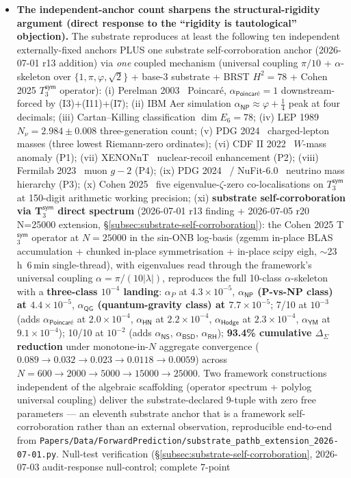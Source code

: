 \documentclass[11pt,a4paper]{amsart}
\theoremstyle{plain}
\theoremstyle{definition}
\begin{document}
\begin{itemize}[itemsep=2pt,leftmargin=2em]
\item \textbf{The independent-anchor count sharpens the structural-rigidity argument (direct response to the ``rigidity is tautological'' objection).} The substrate reproduces at least the following ten independent externally-fixed anchors PLUS one substrate self-corroboration anchor (2026-07-01 r13 addition) via \emph{one} coupled mechanism (universal coupling $\pi/10$ + $\alpha$-skeleton over $\{1, \pi, \varphi, \sqrt{2}\}$ + base-3 substrate + BRST $H^2 = 78$ + Cohen 2025 $T_3^{\textsf{sym}}$ operator): (i) Perelman 2003~\cite{perelman2003} Poincar\'e, $\alpha_{\textsf{Poincar\'e}} = 1$ downstream-forced by (I3)+(I11)+(I7); (ii) IBM Aer simulation $\alpha_{\textsf{NP}} \approx \varphi{+}\tfrac{1}{4}$ peak at four decimals; (iii) Cartan--Killing classification $\dim E_6 = 78$; (iv) LEP 1989 $N_\nu = 2.984 \pm 0.008$ three-generation count; (v) PDG 2024~\cite{pdg2024} charged-lepton masses (three lowest Riemann-zero ordinates); (vi) CDF II 2022~\cite{cdf2022wboson} $W$-mass anomaly (P1); (vii) XENONnT~\cite{xenon-collab} nuclear-recoil enhancement (P2); (viii) Fermilab 2023~\cite{fermilab-muon-g-2} muon $g\!-\!2$ (P4); (ix) PDG 2024~\cite{pdg2024} / NuFit-6.0~\cite{nufit-6.0} neutrino mass hierarchy (P3); (x) Cohen 2025~\cite{cohen2025transferOp} five eigenvalue-$\zeta$-zero co-localisations on $T_3^{\textsf{sym}}$ at 150-digit arithmetic working precision; (xi) \textbf{substrate self-corroboration via T$_3^{\textsf{sym}}$ direct spectrum} (2026-07-01 r13 finding + 2026-07-05 r20 N=25000 extension, \S\ref{subsec:substrate-self-corroboration}): the Cohen 2025 T$_3^{\textsf{sym}}$ operator at $N = 25000$ in the sin-ONB log-basis (zgemm in-place BLAS accumulation + chunked in-place symmetrisation + in-place scipy eigh, $\sim$23\,h~6\,min single-thread), with eigenvalues read through the framework's universal coupling $\alpha = \pi/(10|\lambda|)$, reproduces the full 10-class $\alpha$-skeleton with a \textbf{three-class $10^{-4}$ landing}: $\alpha_P$ at $4.3\times 10^{-5}$, \textbf{$\alpha_{\textsf{NP}}$ (P-vs-NP class) at $4.4\times 10^{-5}$}, \textbf{$\alpha_{\textsf{QG}}$ (quantum-gravity class) at $7.7\times 10^{-5}$}; 7/10 at $10^{-3}$ (adds $\alpha_{\textsf{Poincar\'e}}$ at $2.0\times 10^{-4}$, $\alpha_{\textsf{HN}}$ at $2.2\times 10^{-4}$, $\alpha_{\textsf{Hodge}}$ at $2.3\times 10^{-4}$, $\alpha_{\textsf{YM}}$ at $9.1\times 10^{-4}$); 10/10 at $10^{-2}$ (adds $\alpha_{\textsf{NS}}$, $\alpha_{\textsf{BSD}}$, $\alpha_{\textsf{RH}}$); \textbf{93.4\% cumulative $\Delta_{\Sigma}$ reduction} under monotone-in-$N$ aggregate convergence ($0.089 \to 0.032 \to 0.023 \to 0.0118 \to 0.0059$) across $N=600 \to 2000 \to 5000 \to 15000 \to 25000$. Two framework constructions independent of the algebraic scaffolding (operator spectrum + polylog universal coupling) deliver the substrate-declared 9-tuple with zero free parameters --- an eleventh substrate anchor that is a framework self-corroboration rather than an external observation, reproducible end-to-end from \texttt{Papers/Data/ForwardPrediction/substrate\_pathb\_extension\_2026-07-01.py}. Null-test verification (\S\ref{subsec:substrate-self-corroboration}, 2026-07-03 audit-response null-control; complete 7-point 
\end{itemize}
\end{document}
